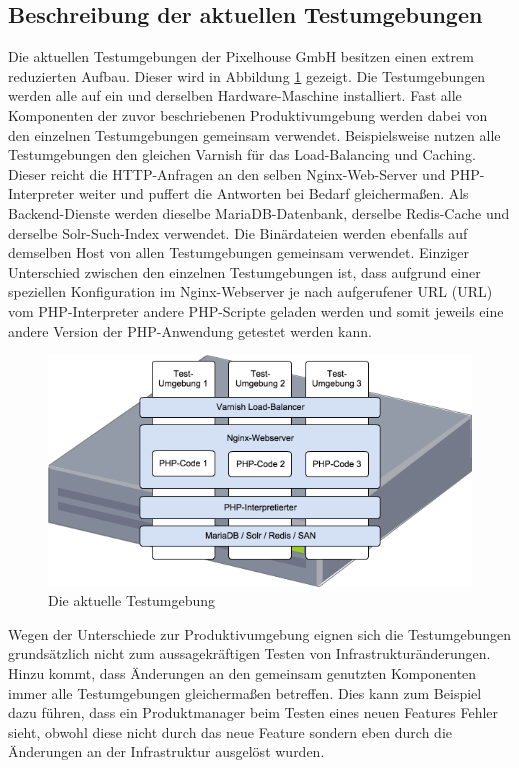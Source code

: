 \subsection{Beschreibung der aktuellen Testumgebungen}

Die aktuellen Testumgebungen der Pixelhouse GmbH besitzen einen extrem reduzierten Aufbau. Dieser wird in Abbildung \ref{alte-test} gezeigt. Die Testumgebungen werden alle auf ein und derselben Hardware-Maschine installiert. Fast alle Komponenten der zuvor beschriebenen Produktivumgebung werden dabei von den einzelnen Testumgebungen gemeinsam verwendet. Beispielsweise nutzen alle Testumgebungen den gleichen Varnish für das Load-Balancing und Caching. Dieser reicht die HTTP-Anfragen an den selben Nginx-Web-Server und PHP-Interpreter weiter und puffert die Antworten bei Bedarf gleichermaßen. Als Backend-Dienste werden dieselbe MariaDB-Datenbank, derselbe Redis-Cache und derselbe Solr-Such-Index verwendet. Die Binärdateien werden ebenfalls auf demselben Host von allen Testumgebungen gemeinsam verwendet. Einziger Unterschied zwischen den einzelnen Testumgebungen ist, dass aufgrund einer speziellen Konfiguration im Nginx-Webserver je nach aufgerufener URL (\acl{URL}) vom PHP-Interpreter andere PHP-Scripte geladen werden und somit jeweils eine andere Version der PHP-Anwendung getestet werden kann.

\begin{figure}[!ht]
  \begin{center}
    \includegraphics[width=14cm]{bilder/Aktuelle-Testumgebung.png}
    \caption{Die aktuelle Testumgebung}
    \label{alte-test}
  \end{center}
\end{figure}

Wegen der Unterschiede zur Produktivumgebung eignen sich die Testumgebungen grundsätzlich nicht zum aussagekräftigen Testen von Infrastrukturänderungen. Hinzu kommt, dass Änderungen an den gemeinsam genutzten Komponenten immer alle Testumgebungen gleichermaßen betreffen. Dies kann zum Beispiel dazu führen, dass ein Produktmanager beim Testen eines neuen Features Fehler sieht, obwohl diese nicht durch das neue Feature sondern eben durch die Änderungen an der Infrastruktur ausgelöst wurden.

